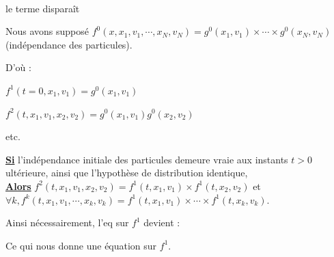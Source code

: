 \documentclass[12pt,a4paper]{article}
\begin{document}
	
	
	\hspace{-.8cm}\\
	
	\rouge{\fbox{!}} le terme  disparaît \rouge{\fbox{!}}
	
	\vspace{.5cm}
		
	\hspace{-.8cm}Nous avons supposé $f^0(x,x_1,v_1,\cdots,x_N,v_N) = g^0(x_1,v_1)\times\cdots\times g^0(x_N,v_N)$ (indépendance des particules).
	
	D'où : \begin{minipage}[t]{18cm}
		$f^1(t=0,x_1,v_1) = g^0(x_1,v_1)$
		
		$f^2(t,x_1,v_1,x_2,v_2) = g^0(x_1,v_1)g^0(x_2,v_2)$
		
		etc.
	\end{minipage}
	
	\textbf{\underline{Si}} l'indépendance initiale des particules demeure vraie aux instants $t>0$ ultérieure, ainsi que l'hypothèse de distribution identique,\\
	\textbf{\underline{Alors}} $f^2(t,x_1,v_1,x_2,v_2) = f^1(t,x_1,v_1)\times f^1(t,x_2,v_2)$ et $\forall k, f^k(t,x_1,v_1,\cdots,x_k,v_k) = f^1(t,x_1,v_1) \times\cdots\times f^1(t,x_k,v_k)$.
	
	Ainsi nécessairement, l'eq sur $f^1$ devient : \\
	
	
	Ce qui nous donne une équation sur $f^1$.
	
\end{document}
